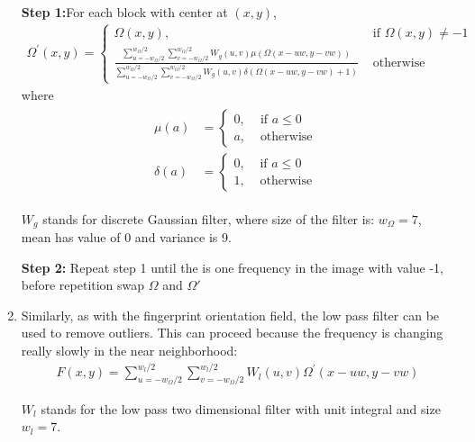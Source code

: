 \begin{enumerate}
    \textbf{Step 1:}For each block with center at $(x, y)$,
    \begin{align}
        \Omega^{\prime}(x, y)=\left\{\begin{array}{ll}
        \Omega(x, y), & \text { if } \Omega(x, y) \neq-1 \\
        \frac{\sum_{u=-w_{\Omega} / 2}^{w_{\Omega} / 2} \sum_{v=-w_{\Omega} / 2}^{w_{\Omega} / 2} W_{g}(u, v) \mu(\Omega(x-u w, y-v w))}{\sum_{u=-w_{\Omega} / 2}^{w_{\Omega} / 2} \sum_{v=-w_{\Omega} / 2}^{w_{\Omega} / 2} W_{g}(u, v) \delta(\Omega(x-u w, y-v w)+1)} & \text { otherwise }
        \end{array}\right.
    \end{align}
        where
    \begin{align}
        \begin{aligned}
        \mu(a) &=\left\{\begin{array}{ll}
        0, & \text { if } a \leq 0 \\
        a, & \text { otherwise }
        \end{array}\right.\\
        \delta(a) &=\left\{\begin{array}{ll}
        0, & \text { if } a \leq 0 \\
        1, & \text { otherwise }
        \end{array}\right.
        \end{aligned}
    \end{align}
	
	$W_g$ stands for discrete Gaussian filter, where size of the filter is: $w_\Omega = 7$, mean has value of 0 and variance is 9.\cite{hong1998fingerprint}
    
    \textbf{Step 2:} Repeat step 1 until the is one frequency in the image with value -1, before repetition swap $\Omega$ and $\Omega'$
    
    \item Similarly, as with the fingerprint orientation field, the low pass filter can be used to remove outliers. This can proceed because the frequency is changing really slowly in the near neighborhood:
    \begin{align}
        F(x, y)=\sum_{u=-w_{\Omega} / 2}^{w_{l} / 2} \sum_{v=-w_{\Omega} / 2}^{w_{l} / 2} W_{l}(u, v) \Omega^{\prime}(x-u w, y-v w)
    \end{align}
	
	$W_l$ stands for the low pass two dimensional filter with unit integral and size $w_l = 7$. \cite{hong1998fingerprint}
	
\end{enumerate}
